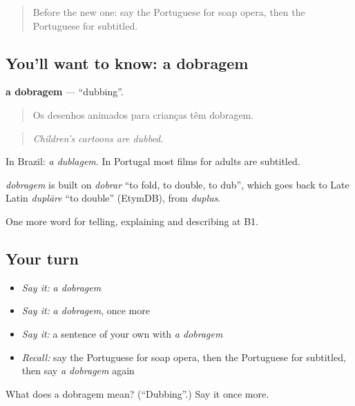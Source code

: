 \label{lesson:PT-C526-dobragem}



\begin{quote}
Before the new one: say the Portuguese for soap opera, then the Portuguese for subtitled.
\end{quote}

\subsection*{You'll want to know: a dobragem}
\textbf{a dobragem} — \textquotedblleft{}dubbing\textquotedblright{}.

\begin{quote}
Os desenhos animados para crianças têm dobragem.
\end{quote}

\begin{quote}
\emph{Children's cartoons are dubbed.}
\end{quote}

In Brazil: \emph{a dublagem}. In Portugal most films for adults are subtitled.

\begin{cousinweb}
\emph{dobragem} is built on \emph{dobrar} \textquotedblleft{}to fold, to double, to dub\textquotedblright{}, which goes back to Late Latin \emph{duplāre} \textquotedblleft{}to double\textquotedblright{} (EtymDB), from \emph{duplus}.
\end{cousinweb}

\begin{grammarlens}[title={What you've built}]
One more word for telling, explaining and describing at B1.
\end{grammarlens}

\subsection*{Your turn}
\begin{itemize}
\raggedright
  \item \emph{Say it:} \emph{a dobragem}
  \item \emph{Say it:} \emph{a dobragem}, once more
  \item \emph{Say it:} a sentence of your own with \emph{a dobragem}
  \item \emph{Recall:} say the Portuguese for soap opera, then the Portuguese for subtitled, then say \emph{a dobragem} again
\end{itemize}

\begin{tcolorbox}[breakable,colback=teal!4,colframe=teal!35!black,title={Before you move on}]
What does a dobragem mean? (\textquotedblleft{}Dubbing\textquotedblright{}.) Say it once more.
\end{tcolorbox}
